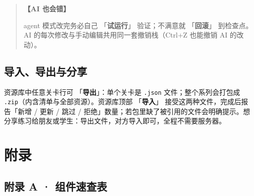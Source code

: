 \documentclass[UTF8,a4paper,zihao=-4]{ctexart}
\newcommand{\code}[1]{\texttt{#1}}   %
\newcommand{\ui}[1]{「\textbf{#1}」}  %
\newenvironment{tip}[1][提示]{%
  \begin{quote}\small\textbf{【#1】}\ignorespaces
}{\end{quote}}
\begin{document}
\begin{tip}[AI 也会错]
agent 模式改完务必自己 \ui{试运行} 验证；不满意就 \ui{回滚} 到检查点。AI 的每次修改与手动编辑共用同一套撤销栈（Ctrl+Z 也能撤销 AI 的改动）。
\end{tip}

\subsection{导入、导出与分享}

资源库中任意关卡行可 \ui{导出}：单个关卡是 \code{.json} 文件；整个系列会打包成 \code{.zip}（内含清单与全部资源）。资源库顶部 \ui{导入} 接受这两种文件，完成后报告「新增 / 更新 / 跳过 / 拒绝」数量；若包里缺了被引用的文件会明确提示。想分享练习给朋友或学生：导出文件，对方导入即可，全程不需要服务器。

\section{附录}

\subsection*{附录 A · 组件速查表}
\end{document}
